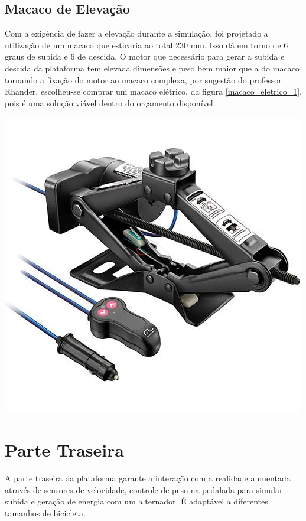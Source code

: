 \subsection{Macaco de Elevação}

  Com a exigência de fazer a elevação durante a simulação, foi projetado a utilização de um macaco que esticaria ao total 230 mm. Isso dá em torno de 6 graus de subida e 6 de descida. O motor que necessário para gerar a subida e descida da plataforma  tem elevada dimensões e peso bem maior que a do macaco tornando a fixação do motor ao macaco complexa, por sugestão do professor Rhander, escolheu-se comprar um macaco elétrico, da figura \ref{macaco_eletrico_1}, pois é uma solução viável dentro do orçamento disponível.

    \begin{center}
    	\includegraphics[scale=0.5]{figuras/macaco_eletrico_1}
        \label{macaco_eletrico_1}
    \end{center}    

\section{Parte Traseira}
    A parte traseira da plataforma garante a interação com a realidade aumentada através de sensores de velocidade, controle de peso na pedalada para simular subida e geração de energia com um alternador. É adaptável a diferentes tamanhos de bicicleta.
 
